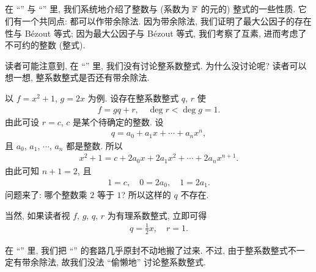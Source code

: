 \subsection*{\PolynomialsOverZAndOverQ}
\markright{\PolynomialsOverZAndOverQ}

在 ``\SomePropertiesOfIntegers '' 与 ``\SomePropertiesOfPolynomials '' 里, 我们系统地介绍了整数与 (系数为 $\mathbb{F}$ 的元的) 整式的一些性质. 它们有一个共同点: 都可以作带余除法. 因为带余除法, 我们证明了最大公因子的存在性与 Bézout 等式; 因为最大公因子与 Bézout 等式, 我们考察了互素, 进而考虑了不可约的整数 (整式).

读者可能注意到, 在 ``\SomePropertiesOfPolynomials '' 里, 我们没有讨论整系数整式. 为什么没讨论呢? 读者可以想一想, 整系数整式是否还有带余除法.

\begin{example}
    以 $f = x^2 + 1$, $g = 2x$ 为例. 设存在整系数整式 $q$, $r$ 使
    \begin{align*}
        f = gq + r, \quad \deg r < \deg g = 1.
    \end{align*}
    由此可设 $r = c$, $c$ 是某个待确定的整数. 设
    \begin{align*}
        q = a_0 + a_1 x + \cdots + a_n x^n,
    \end{align*}
    且 $a_0$, $a_1$, $\cdots$, $a_n$ 都是整数. 所以
    \begin{align*}
        x^2 + 1 = c + 2a_0 x + 2a_1 x^2 + \cdots + 2a_n x^{n+1}.
    \end{align*}
    由此可知 $n+1 = 2$, 且
    \begin{align*}
        1 = c, \quad 0 = 2a_0, \quad 1 = 2a_1.
    \end{align*}
    问题来了: 哪个整数乘 $2$ 等于 $1$? 所以这样的 $q$ 不存在.

    当然, 如果读者视 $f$, $g$, $q$, $r$ 为有理系数整式, 立即可得
    \begin{align*}
        q = \frac{1}{2}x, \quad r = 1.
    \end{align*}
\end{example}

在 ``\SomePropertiesOfPolynomials '' 里, 我们把 ``\SomePropertiesOfIntegers '' 的套路几乎原封不动地搬了过来. 不过, 由于整系数整式不一定有带余除法, 故我们没法 ``偷懒地'' 讨论整系数整式.

